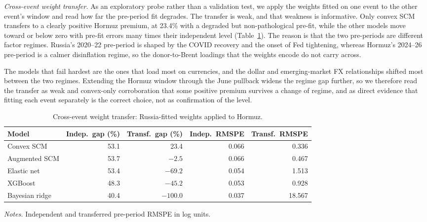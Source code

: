 \textit{Cross-event weight transfer.} As an exploratory probe rather than a validation
test, we apply the weights fitted on one event to the other event's window and read how far
the pre-period fit degrades. The transfer is weak, and that weakness is informative. Only
convex SCM transfers to a clearly positive Hormuz premium, at 23.4\% with a degraded but
non-pathological pre-fit, while the other models move toward or below zero with pre-fit
errors many times their independent level (Table~\ref{tab:transfer}). The reason is that
the two pre-periods are different factor regimes. Russia's 2020--22 pre-period is shaped by
the COVID recovery and the onset of Fed tightening, whereas Hormuz's 2024--26 pre-period is
a calmer disinflation regime, so the donor-to-Brent loadings that the weights encode do not
carry across.

The models that fail hardest are the ones that load most on currencies, and
the dollar and emerging-market FX relationships shifted most between the two regimes.
Extending the Hormuz window through the June pullback widens the regime gap further, so we
therefore read the transfer as weak and convex-only corroboration that some positive
premium survives a change of regime, and as direct evidence that fitting each event
separately is the correct choice, not as confirmation of the level.

\begin{table}[h]
\centering
\caption{Cross-event weight transfer: Russia-fitted weights applied to Hormuz.}
\label{tab:transfer}
\begin{threeparttable}
\small
\begin{tabular}{@{}lrrrr@{}}
\toprule
Model & Indep.\ gap (\%) & Transf.\ gap (\%) & Indep.\ RMSPE & Transf.\ RMSPE \\
\midrule
Convex SCM     & 53.1 & 23.4   & 0.066 & 0.336 \\
Augmented SCM  & 53.7 & $-2.5$  & 0.066 & 0.467 \\
Elastic net    & 53.4 & $-69.2$ & 0.054 & 1.513 \\
XGBoost        & 48.3 & $-45.2$ & 0.053 & 0.928 \\
Bayesian ridge & 40.4 & $-100.0$ & 0.037 & 18.567 \\
\bottomrule
\end{tabular}
\begin{tablenotes}[flushleft]
\footnotesize
\item \textit{Notes.} Independent and transferred pre-period RMSPE in log units.
\end{tablenotes}
\end{threeparttable}
\end{table}

